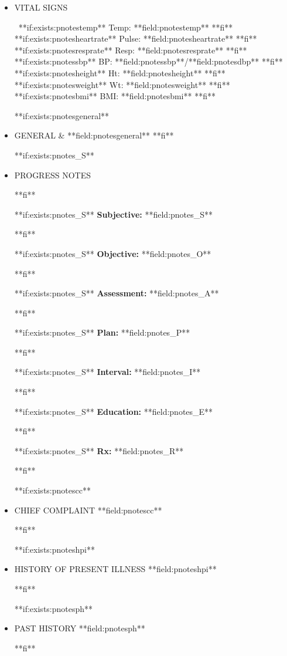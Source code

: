 \documentclass{article}
\newcommand{\sheading}[1]{\textbf{#1:}}
\begin{document}
\begin{itemize}
\item{VITAL SIGNS}
\par
\ 
**if:exists:pnotestemp**
{Temp: }**field:pnotestemp**
**fi**
**if:exists:pnotesheartrate**
{     Pulse: }**field:pnotesheartrate**
**fi**
**if:exists:pnotesresprate**
{     Resp: }**field:pnotesresprate**
**fi**
**if:exists:pnotessbp**
{     BP: }**field:pnotessbp**/**field:pnotesdbp**
**fi**
**if:exists:pnotesheight**
{Ht: }**field:pnotesheight**
**fi**
**if:exists:pnotesweight**
{     Wt: }**field:pnotesweight**
**fi**
**if:exists:pnotesbmi**
{     BMI: }**field:pnotesbmi**
**fi**

**if:exists:pnotesgeneral**
\item{GENERAL} & **field:pnotesgeneral**
**fi**

**if:exists:pnotes_S**
\
\item{PROGRESS NOTES}
\par
**fi**

**if:exists:pnotes_S**
\sheading{Subjective} **field:pnotes_S**
\par
**fi**

**if:exists:pnotes_S**
\sheading{Objective} **field:pnotes_O**
\par
**fi**

**if:exists:pnotes_S**
\sheading{Assessment} **field:pnotes_A**
\par
**fi**

**if:exists:pnotes_S**
\sheading{Plan} **field:pnotes_P**
\par
**fi**

**if:exists:pnotes_S**
\sheading{Interval} **field:pnotes_I**
\par
**fi**

**if:exists:pnotes_S**
\sheading{Education} **field:pnotes_E**
\par
**fi**

**if:exists:pnotes_S**
\sheading{Rx} **field:pnotes_R**
\par
**fi**

**if:exists:pnotescc**
\
\item{CHIEF COMPLAINT} **field:pnotescc**
\par
**fi**

**if:exists:pnoteshpi**
\
\item{HISTORY OF PRESENT ILLNESS} **field:pnoteshpi**
\par
**fi**

**if:exists:pnotesph**
\
\item{PAST HISTORY} **field:pnotesph**
\par
**fi**


\end{itemize}
\end{document}

